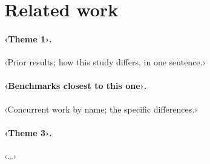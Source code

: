 \section{Related work}
\label{sec:related}
\paragraph{‹Theme 1›.} ‹Prior results; how this study differs, in one sentence.›
\paragraph{‹Benchmarks closest to this one›.} ‹Concurrent work by name; the specific differences.›
\paragraph{‹Theme 3›.} ‹…›
